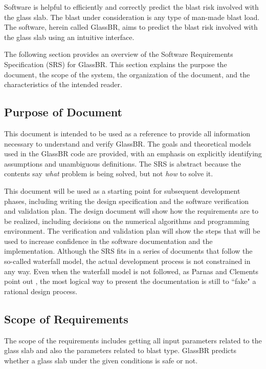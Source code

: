 \documentclass[12pt]{article}
\newcommand{\progname}{GlassBR}
\begin{document}
Software is helpful to efficiently and correctly predict the blast risk involved
with the glass slab. The blast under consideration is any type of man-made
blast load. The software, herein called \progname, aims to predict the blast risk
involved with the glass slab using an intuitive interface.  

The following section provides an overview of the Software Requirements Specification (SRS)
for \progname.  This section explains the purpose the document, the scope of 
the system, the organization of the document, and the characteristics of 
the intended reader.

\subsection{Purpose of Document}

This document is intended to be used as a reference to provide all information
necessary to understand and verify \progname{}. The goals and theoretical models
used in the \progname{} code are provided, with an emphasis on explicitly
identifying assumptions and unambiguous definitions.  The SRS is abstract
because the contents say \emph{what} problem is being solved, but not \emph{how}
to solve it.

This document will be used as a starting point for subsequent development
phases, including writing the design specification and the software verification
and validation plan.  The design document will show how the requirements are to
be realized, including decisions on the numerical algorithms and programming
environment.  The verification and validation plan will show the steps that will
be used to increase confidence in the software documentation and the
implementation. Although the SRS fits
in a series of documents that follow the so-called waterfall model, the actual development
process is not constrained in any way. Even when the waterfall model is not followed, as
Parnas and Clements point out \cite{ParnasAndClements1986}, the most logical way to present
the documentation is still to ``fake" a rational design process.

\subsection{Scope of Requirements} 

The scope of the requirements includes getting all input parameters related to
the glass slab and also the parameters related to blast type.
\progname{} predicts whether a glass slab under the given conditions is safe or not.
\end{document}
